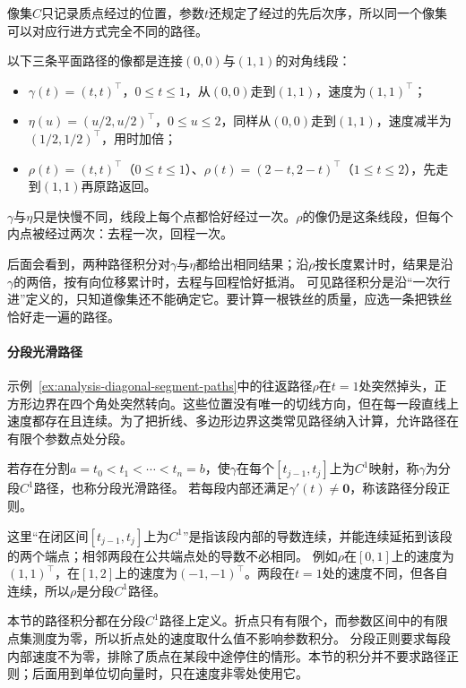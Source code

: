 像集$C$只记录质点经过的位置，参数$t$还规定了经过的先后次序，所以同一个像集可以对应行进方式完全不同的路径。
\begin{example}[同一条对角线段上的三条路径]
\label{ex:analysis-diagonal-segment-paths}
以下三条平面路径的像都是连接$(0,0)$与$(1,1)$的对角线段：
\begin{itemize}
 \item $\gamma(t)=(t,t)^\top$，$0\leq t\leq1$，从$(0,0)$走到$(1,1)$，速度为$(1,1)^\top$；
 \item $\eta(u)=(u/2,u/2)^\top$，$0\leq u\leq2$，同样从$(0,0)$走到$(1,1)$，速度减半为$(1/2,1/2)^\top$，用时加倍；
 \item $\rho(t)=(t,t)^\top$（$0\leq t\leq1$）、$\rho(t)=(2-t,2-t)^\top$（$1\leq t\leq2$），先走到$(1,1)$再原路返回。
\end{itemize}
$\gamma$与$\eta$只是快慢不同，线段上每个点都恰好经过一次。$\rho$的像仍是这条线段，但每个内点被经过两次：去程一次，回程一次。
\end{example}

后面会看到，两种路径积分对$\gamma$与$\eta$都给出相同结果；沿$\rho$按长度累计时，结果是沿$\gamma$的两倍，按有向位移累计时，去程与回程恰好抵消。
可见路径积分是沿“一次行进”定义的，只知道像集还不能确定它。要计算一根铁丝的质量，应选一条把铁丝恰好走一遍的路径。

\paragraph{分段光滑路径}

示例~\ref{ex:analysis-diagonal-segment-paths}中的往返路径$\rho$在$t=1$处突然掉头，正方形边界在四个角处突然转向。这些位置没有唯一的切线方向，但在每一段直线上速度都存在且连续。为了把折线、多边形边界这类常见路径纳入计算，允许路径在有限个参数点处分段。
\begin{definition}[分段光滑路径]
若存在分割$a=t_0<t_1<\cdots<t_n=b$，使$\gamma$在每个$[t_{j-1},t_j]$上为$C^1$映射，称$\gamma$为分段$C^1$路径，也称分段光滑路径。
若每段内部还满足$\gamma'(t)\neq\bm0$，称该路径分段正则。
\end{definition}

这里“在闭区间$[t_{j-1},t_j]$上为$C^1$”是指该段内部的导数连续，并能连续延拓到该段的两个端点；相邻两段在公共端点处的导数不必相同。
例如$\rho$在$[0,1]$上的速度为$(1,1)^\top$，在$[1,2]$上的速度为$(-1,-1)^\top$。两段在$t=1$处的速度不同，但各自连续，所以$\rho$是分段$C^1$路径。

本节的路径积分都在分段$C^1$路径上定义。折点只有有限个，而参数区间中的有限点集测度为零，所以折点处的速度取什么值不影响参数积分。
分段正则要求每段内部速度不为零，排除了质点在某段中途停住的情形。本节的积分并不要求路径正则；后面用到单位切向量时，只在速度非零处使用它。

